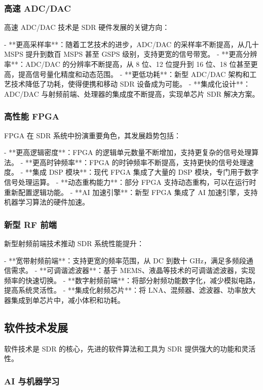 \documentclass[UTF8]{ctexbook}
\begin{document}
\subsubsection{高速 ADC/DAC}

高速 ADC/DAC 技术是 SDR 硬件发展的关键方向：

- **更高采样率**：随着工艺技术的进步，ADC/DAC 的采样率不断提高，从几十 MSPS 提升到数百 MSPS 甚至 GSPS 级别，支持更宽的信号带宽。
- **更高分辨率**：ADC/DAC 的分辨率不断提高，从 8 位、12 位提升到 16 位、18 位甚至更高，提高信号量化精度和动态范围。
- **更低功耗**：新型 ADC/DAC 架构和工艺技术降低了功耗，使得便携和移动 SDR 设备成为可能。
- **集成化设计**：ADC/DAC 与射频前端、处理器的集成度不断提高，实现单芯片 SDR 解决方案。

\subsubsection{高性能 FPGA}

FPGA 在 SDR 系统中扮演重要角色，其发展趋势包括：

- **更高逻辑密度**：FPGA 的逻辑单元数量不断增加，支持更复杂的信号处理算法。
- **更高时钟频率**：FPGA 的时钟频率不断提高，支持更快的信号处理速度。
- **集成 DSP 模块**：现代 FPGA 集成了大量的 DSP 模块，专门用于数字信号处理运算。
- **动态重构能力**：部分 FPGA 支持动态重构，可以在运行时重新配置逻辑功能。
- **AI 加速引擎**：新型 FPGA 集成了 AI 加速引擎，支持机器学习算法的硬件加速。

\subsubsection{新型 RF 前端}

新型射频前端技术推动 SDR 系统性能提升：

- **宽带射频前端**：支持更宽的频率范围，从 DC 到数十 GHz，满足多频段通信需求。
- **可调谐滤波器**：基于 MEMS、液晶等技术的可调谐滤波器，实现频率的快速切换。
- **数字射频前端**：将部分射频功能数字化，减少模拟电路，提高系统灵活性。
- **集成化射频芯片**：将 LNA、混频器、滤波器、功率放大器集成到单芯片中，减小体积和功耗。

\subsection{软件技术发展}

软件技术是 SDR 的核心，先进的软件算法和工具为 SDR 提供强大的功能和灵活性。

\subsubsection{AI 与机器学习}
\end{document}
